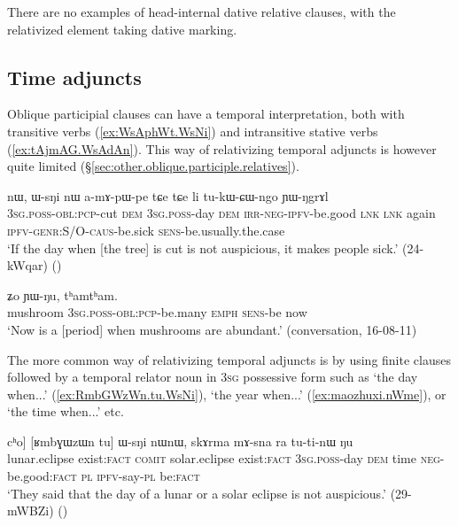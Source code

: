 There are no examples of head-internal dative relative clauses, with the relativized element taking dative marking.
 
\subsection{Time adjuncts} \label{sec:time.relativization}
Oblique participial clauses can have a temporal interpretation, both with transitive verbs (\ref{ex:WsAphWt.WsNi}) and intransitive stative verbs (\ref{ex:tAjmAG.WsAdAn}). This way of relativizing temporal adjuncts is however quite limited (§\ref{sec:other.oblique.participle.relatives}).

\begin{exe}
\ex \label{ex:WsAphWt.WsNi}
\gll [ɯ-sɤ-pʰɯt] nɯ, ɯ-sŋi nɯ a-mɤ-pɯ-pe tɕe tɕe li tu-kɯ-ɕɯ-ngo ɲɯ-ŋgrɤl \\
\textsc{3sg}.\textsc{poss}-\textsc{obl}:\textsc{pcp}-cut \textsc{dem} \textsc{3sg}.\textsc{poss}-day \textsc{dem} \textsc{irr}-\textsc{neg}-\textsc{ipfv}-be.good \textsc{lnk} \textsc{lnk} again \textsc{ipfv}-\textsc{genr}:S/O-\textsc{caus}-be.sick \textsc{sens}-be.usually.the.case \\
\glt `If the day when [the tree] is cut is not auspicious, it makes people sick.' (24-kWqar)
()
\end{exe}

\begin{exe}
\ex \label{ex:tAjmAG.WsAdAn}
 ʑo ɲɯ-ŋu, tʰamtʰam. \\
mushroom \textsc{3sg}.\textsc{poss}-\textsc{obl}:\textsc{pcp}-be.many \textsc{emph} \textsc{sens}-be now \\
\glt `Now is a [period] when mushrooms are abundant.' (conversation, 16-08-11)
\end{exe}

The more common way of relativizing temporal adjuncts is by using finite clauses followed by a temporal relator noun in \textsc{3sg} possessive form such as   `the day when...' (\ref{ex:RmbGWzWn.tu.WsNi}),  `the year when...' (\ref{ex:maozhuxi.nWme}), or  `the time when...' etc.  
 
\begin{exe}
\ex \label{ex:RmbGWzWn.tu.WsNi}
\gll [[slɤzɯn tu] cʰo] [ʁmbɣɯzɯn tu] ɯ-sŋi nɯnɯ, skɤrma mɤ-sna ra tu-ti-nɯ ŋu \\
lunar.eclipse exist:\textsc{fact} \textsc{comit} solar.eclipse exist:\textsc{fact} \textsc{3sg}.\textsc{poss}-day \textsc{dem} time \textsc{neg}-be.good:\textsc{fact} \textsc{pl} \textsc{ipfv}-say-\textsc{pl} be:\textsc{fact} \\
\glt `They said that the day of a lunar or a solar eclipse is not auspicious.' (29-mWBZi)
()
\end{exe}

